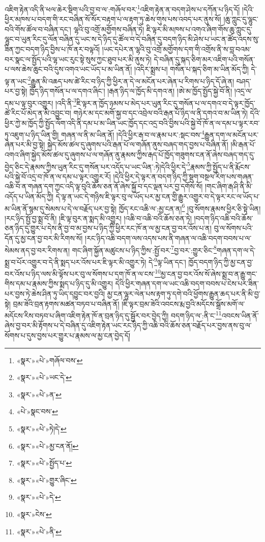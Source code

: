 འཇིག་རྟེན་འདི་ནི་ཕལ་ཆེར་སྡིག་པའི་བྱ་བ་ལ་:གཞོལ་བར་\footnote{«སྣར་»«པེ་»གཞོལ་བས་}འཇིག་རྟེན་ན་བདག་ཤེས་པ་དཀོན་པ་ཉིད་དོ། །དེའི་ཕྱིར་མཁས་པ་བདག་གི་རང་བཞིན་སོ་སོར་བརྟག་པ་ལ་རྟག་ཏུ་ཆེས་གུས་པས་འབད་པར་ནུས་སོ། །ཆུ་ཀླུང་དུ་ལྷུང་བའི་གོས་ཚོལ་བ་བཞིན་དང་། ལྷའི་བུ་འགྲོ་མགྱོགས་བཞིན་ཏེ། ཇི་ལྟར་མི་མཁས་པ་འགའ་ཞིག་གོས་ཆུ་ཀླུང་དུ་ལྷུང་བ་ཡུན་རིང་དུ་ལོན་བཞིན་དུ་ཡང་ས་དེ་ཉིད་དུ་ཚོལ་བ་དེ་བཞིན་དུ་བདག་ཉིད་མི་ཤེས་པ་ཡང་ན་ཚོད་འདས་སུ་ཟིན་ཀྱང་བདག་ཉིད་བྱིས་པ་ཁོ་ནར་བལྟའོ། །ཡང་དཔེར་ན་ལྷའི་བུ་འགྲོ་མགྱོགས་དག་གི་འགྲོས་ནི་ས་བླ་བའམ་བར་སྣང་ལ་སྤྱོད་པའི་ལྷ་ཡང་རུང་སྟེ་སུས་ཀྱང་ཐུབ་པར་མི་ནུས་ཏེ། དེ་བཞིན་དུ་སྐད་ཅིག་མར་འཇིག་པའི་གསོན་པ་ལས་ཆེས་ཆུང་བའི་དུས་འགའ་ཡང་ཡོད་པ་མ་ཡིན་ནོ། །འདིར་སྨྲས་པ། གསོན་པ་སྐད་ཅིག་མ་ཡིན་མོད་ཀྱི། དེ་ལྟ་ན་ཡང་\footnote{«སྣར་»«པེ་»ཡང་དེ་}རྒྱུན་མི་འཆད་པས་ཚེ་རིང་བ་ཉིད་ཀྱི་ཕྱིར་ན་དེ་ལ་མངོན་པར་ཞེན་པ་རིགས་པ་ཉིད་དོ་ཞེ་ན། བཤད་པར་བྱ་སྟེ། ཁྱོད་ཉིད་གསོན་པ་ལ་དགའ་ཞིང་། །རྒན་ཉིད་ལ་ཁྱོད་མི་དགའ་ན། །ཨེ་མ་ཁྱོད་སྤྱོད་སྐྱེ་བོ་ནི། །འདྲ་ལ་དམ་པ་ལྟ་བུར་འགྱུར། །འདི་ནི་\footnote{«སྣར་»«པེ་»ན་}ཇི་ལྟར་ན་ཁྱོད་ཉམས་པ་མེད་པར་ཡུན་རིང་དུ་གསོན་པ་ལ་དགའ་བ་དེ་ལྟར་ཁྱོད་ཚེ་རིང་པོ་མེད་ན་མི་འབྱུང་བ། གཉེར་མ་དང་མགོ་སྐྱ་བ་དང་འབྲེལ་བའི་རྒན་པོ་ཉིད་ལ་ནི་དགའ་བ་མ་ཡིན་ཏེ། དེའི་ཕྱིར་ཀྱེ་མ་ཁྱོད་ཀྱི་སྤྱོད་ལོག་འདི་ནི་དམ་པ་མ་ཡིན་ཡང་ཁྱོད་དང་འདྲ་བའི་བྱིས་པའི་སྐྱེ་བོ་ཁོ་ན་ལ་དམ་པ་ལྟར་རབ་ཏུ་འཇུག་པ་ཉིད་ཡིན་གྱི། གཞན་ལ་ནི་མ་ཡིན་ནོ། །དེའི་ཕྱིར་རྒ་བ་ལ་རྣམ་པར་:སྡང་བས་\footnote{«པེ་»སྣང་བས་}རྒྱུན་དག་ལ་མངོན་པར་ཞེན་པར་མི་བྱ་སྟེ། སྐྱེད་མོས་ཚལ་དུ་ཞུགས་པའི་རྒན་པོ་ལ་གཞོན་ནུས་བཞད་གད་བྱས་པ་བཞིན་ནོ། །མི་རྒན་པོ་འགའ་ཞིག་སྐྱེད་མོས་ཚལ་དུ་ཞུགས་པ་ལ་གཞོན་ནུ་རྣམས་ཀྱིས་རྒད་པོ་ཁྱོད་གཟུགས་ངན་ནོ་ཞེས་བཞད་གད་དུ་བྱེད་ཅིང་དེ་རྣམས་ཀྱིས་ཡུན་རིང་དུ་གསོན་པར་འདོད་པ་ཡང་ཡིན་:ཏེ།དེའི་ཕྱིར་དེ་\footnote{«སྣར་»«པེ་»ཏེ།དེ་}རྣམས་ཀྱི་སྤྱོད་པ་ནི་རྨོངས་པའི་སྐྱེ་བོ་འདྲ་བ་ཁོ་ན་ལ་དམ་པ་ལྟར་འགྱུར་རོ། །དེའི་ཕྱིར་དེ་ལྟར་ན་བདག་ཉིད་ཀྱི་སྡུག་བསྔལ་རིག་པས་གཞན་འཆི་བ་ན་གཞན་དག་ཀྱང་འདི་ལྟ་བུའི་ཆོས་ཅན་ནོ་ཞེས་སྐྱོ་བ་དང་ལྡན་པར་བྱ་དགོས་སོ། །གང་ཞིག་རྒ་ཤི་ནི་མི་འདོད་པ་ཡིན་མོད་ཀྱི། དེ་ལྟ་ན་ཡང་དེ་གཉིས་ཇི་ལྟར་བུ་ལ་ཡོད་པར་མྱ་ངན་གྱི་རྒྱུར་འགྱུར་བ་དེ་ལྟར་རང་ལ་ཡོད་པ་མ་ཡིན་ནོ་སྙམ་དུ་སེམས་པ་དེ་ལ་བརྗོད་པར་བྱ་སྟེ། ཁྱོད་རང་འཆི་ལ་:མྱ་ངན་ན།\footnote{«སྣར་»«པེ་»མྱ་ངན་ནོ།} །བུ་སོགས་རྣམས་ཕྱིར་ཅི་སྟེ་ཡིན། །རང་ཉིད་སྤྱོ་བྱ་སྨྲ་བོ་ནི། །ཇི་ལྟ་བུར་ན་སྨད་མི་འགྱུར། །འཆི་བ་འཆི་བའི་ཆོས་ཅན་ཏེ། །བདག་ཉིད་འཆི་བའི་ཆོས་ཅན་ཉིད་དུ་གྱུར་པ་དེས་ནི་བྱ་བ་མ་བྱས་པ་ཉིད་ཀྱི་ཕྱིར་རང་ཁོ་ན་ལ་མྱ་ངན་བྱ་བར་འོས་པ་ན། བུ་ལ་སོགས་པའི་དོན་དུ་མྱ་ངན་བྱ་བར་མི་རིགས་སོ། །རང་ཉིད་འཆི་བདག་ལས་འདས་པས་ནི་གཞན་ལ་འཆི་བདག་བབས་པ་ལ་སེམས་ནད་བྱ་བར་རིགས་ན། གང་ཞིག་སྐྱོན་མཚུངས་པ་ཉིད་ཀྱིས་:སྤྱོ་བར་\footnote{«སྣར་»«པེ་»སྤྱོད་པ་}བྱ་བར་:གྱུར་ཅིང་\footnote{«སྣར་»«པེ་»གྱུར་ཞིང་}གཞན་དག་ལ་དེ་སྨྲ་བ་པོར་འགྱུར་བ་དེ་ནི་སྨད་པར་འོས་པར་ཇི་ལྟར་མི་འགྱུར་ཏེ། དེ་\footnote{«སྣར་»«པེ་»དེ་}ལྟ་ཡིན་དང་། ཁྱོད་བདག་ཉིད་ཀྱི་མྱ་ངན་བྱ་བར་འོས་པ་ཉིད་ལས་མི་ལྟོས་པར་བུ་ལ་སོགས་པ་དག་ཁོ་ན་ལ་ངས་\footnote{«སྣར་»ངེས་}མྱ་ངན་བྱ་བར་འོས་སོ་ཞེས་སྨྲ་བ་ན་རྒྱུ་གང་གིས་དམ་པ་རྣམས་ཀྱིས་སྨད་པ་ཉིད་དུ་མི་འགྱུར། དེའི་ཕྱིར་གཞན་དག་ལ་ཡང་འཆི་བདག་བབས་པ་ངེས་པར་ཟིན་པར་བྱས་ཏེ་ཆེས་ཤིན་ཏུ་ཡིད་དབྱུང་བར་བྱའི། མྱ་ངན་ལྷུར་ལེན་པས་རྟག་ཏུ་དགེ་བའི་ཕྱོགས་རྒྱུན་ཆད་པར་ནི་མི་བྱ་སྟེ། བྲམ་ཟེའི་བྲན་རྟགས་མཚན་བཏབ་པ་བཞིན་ནོ། །ཇི་ལྟར་བྲམ་ཟེའི་འབངས་རྨ་བྱའི་མདོངས་སྒྲོས་མགོ་ལ་མདོངས་རིས་བཏབ་པ་ཞིག་འཇིག་རྟེན་ཁོ་ན་བྲན་ཉིད་དུ་སྦྱོར་བར་བྱེད་ཀྱི། བདག་ཉིད་ལ་:ནི་ང་\footnote{«སྣར་»«པེ་»ནི་}འབངས་ཡིན་ནོ་ཞེས་བྱ་བར་མི་རྟོགས་པ་དེ་བཞིན་དུ་འཇིག་རྟེན་ཡང་རང་ཉིད་ཀྱི་འཆི་བའི་ཆོས་ཅན་བརྗོད་པར་བྱས་ནས་བུ་ལ་སོགས་པ་དུས་བྱས་པར་གྱུར་པ་རྣམས་ལ་མྱ་ངན་བྱེད་དོ། 